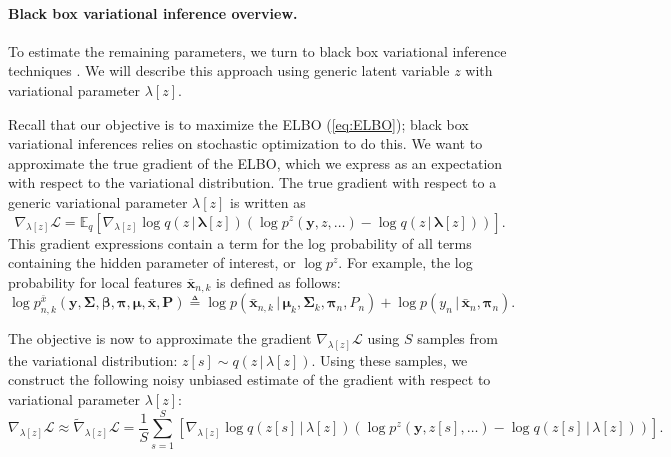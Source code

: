 \documentclass[twoside,11pt]{article}
\newcommand{\E}{\mathbb{E}}
\newcommand{\g}{\, | \,}
\begin{document}
\paragraph{Black box variational inference overview.}  To estimate the remaining parameters, we turn to black box variational inference techniques \citep{Ranganath:2015}.  We will describe this approach using generic latent variable $z$ with variational parameter $\lambda[z]$.

Recall that our objective is to maximize the ELBO (\cref{eq:ELBO}); black box variational inferences relies on stochastic optimization to do this.  We want to approximate the true gradient of the ELBO, which we express as an expectation with respect to the variational distribution.  The true gradient with respect to a generic variational parameter $\lambda[z]$ is written as 
\begin{equation}
    \nabla_{\lambda[z]} \mathcal{L} =
    \E_q \left[ \nabla_{\lambda[z]} \log q(z \g \boldsymbol{\lambda}[z]) \left( \log p^{z}(\boldsymbol{y}, z, \dots) - \log q(z \g \boldsymbol{\lambda}[z])\right)\right].
\end{equation}
This gradient expressions contain a term for the log probability of all terms containing the hidden parameter of interest, or $\log p^{z}$.  For example, the log probability for local features $\boldsymbol{\bar{x}}_{n,k}$ is defined as follows:
\begin{equation}
    \log p^{\bar{x}}_{n,k}( \boldsymbol{y}, \boldsymbol{\Sigma}, \boldsymbol{\beta}, \boldsymbol{\pi}, \boldsymbol{\mu}, \boldsymbol{\bar{x}}, \boldsymbol{P}) \triangleq \log p(\boldsymbol{\bar{x}}_{n,k} \g \boldsymbol{\mu}_k, \boldsymbol{\Sigma}_k, \boldsymbol{\pi}_n, P_n) + \log p(y_{n} \g \boldsymbol{\bar{x}}_{n}, \boldsymbol{\pi}_n).
    \label{eq:partiallog}
\end{equation}

The objective is now to approximate the gradient $\nabla_{\lambda[z]} \mathcal{L}$ using $S$ samples from the variational distribution: $z[s] \sim q(z \g \lambda[z])$.  Using these samples, we construct the following noisy unbiased estimate of the gradient with respect to variational parameter $\lambda[z]$:
\begin{equation}
    \nabla_{\lambda[z]} \mathcal{L} \approx
    \tilde\nabla_{\lambda[z]} \mathcal{L} = 
    \frac{1}{S} \sum_{s=1}^S \left[ \nabla_{\lambda[z]} \log q(z[s] \g \lambda[z]) \left( \log p^z(\boldsymbol{y}, z[s], \dots) - \log q(z[s] \g \lambda[z])\right) \right].
\end{equation}
\end{document}
